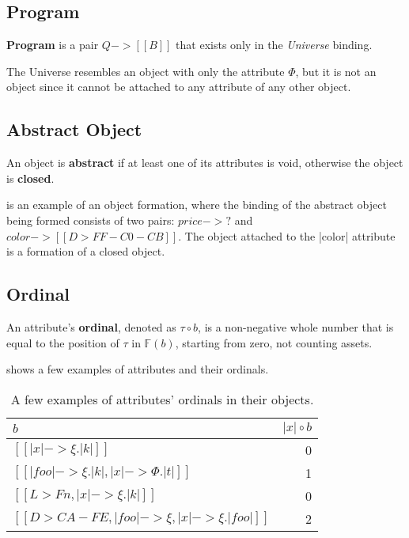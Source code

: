 \subsection{Program}\label{sec:program}

\begin{definition}[Program]
\textbf{Program} is a pair $ Q -> [[ B ]] $ that exists only
in the \textit{Universe} binding.
\end{definition}

The Universe resembles an object with only the attribute \(\Phi\), but it
is not an object since it cannot be attached to any attribute of any other object.

\subsection{Abstract Object}\label{sec:abstract}

\begin{definition}
An object is \textbf{abstract} if at least one of its attributes is void,
otherwise the object is \textbf{closed}.
\end{definition}

 is an example of an object formation, where the binding of
the abstract object being formed consists of two pairs: $price -> ?$ and
$color -> [[ D> FF-C0-CB ]]$. The object attached to the |color| attribute is a
formation of a closed object.

\subsection{Ordinal}\label{sec:ordinal}

\newcommand\ordinal[2]{#1 \circ #2}
\begin{definition}[Ordinal]
An attribute's \textbf{ordinal}, denoted as \(\ordinal{\tau}{b}\),
is a non-negative whole number that is equal to the position of \(\tau\)
in \(\mathbb{F}(b)\), starting from zero, not counting assets.
\end{definition}

\begin{example}
 shows a few examples of attributes and their ordinals.

\begin{table*}
\caption{A few examples of attributes' ordinals in their objects.}
\label{tab:ordinals}
\begin{tabular}{lr}
\toprule
\(b\) & \(\ordinal{|x|}{b}\) \\
\midrule
$[[ |x| -> \xi.|k| ]]$
  & 0 \\
$[[ |foo| -> \xi.|k|, |x| -> \Phi.|t| ]]$
  & 1 \\
$[[ L> Fn, |x| -> \xi.|k| ]]$
  & 0 \\
$[[ D> CA-FE, |foo| -> \xi, |x| -> \xi.|foo| ]]$
  & 2 \\
\bottomrule
\end{tabular}
\end{table*}
\end{example}


